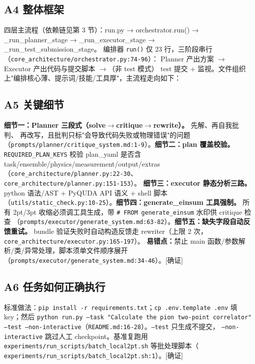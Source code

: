 \documentclass[UTF8]{ctexart}
\begin{document}
\subsection{A4 整体框架}

四层主流程（依赖链见第 3 节）：\textcolor{relation}{run.py → orchestrator.run() →
\_run\_planner\_stage → \_run\_executor\_stage → \_run\_test\_submission\_stage}。
编排器 \texttt{run()} 仅 23 行，三阶段串行（\texttt{\nolinkurl{core_architecture/orchestrator.py:74-96}}）：
Planner 产出方案 $\rightarrow$ Executor 产出代码与提交脚本 $\rightarrow$（非 test 模式）
test 提交 + 监视。文件组织上"编排核心薄、提示词/技能/工具厚"，主流程走向如下：



\subsection{A5 关键细节}

\textbf{细节一：Planner 三段式（solve$\rightarrow$critique$\rightarrow$rewrite）。} 先解、再自我批判、
再改写，且批判只标"会导致代码失败或物理错误"的问题
（\texttt{\nolinkurl{prompts/planner/critique_system.md:1-9}}）。\textbf{细节二：plan 覆盖校验。}
\texttt{REQUIRED\_PLAN\_KEYS} 校验 plan\_yaml 是否含 task/ensemble/physics/measurement/output/extras
（\texttt{\nolinkurl{core_architecture/planner.py:22-30}}、\texttt{\nolinkurl{core_architecture/planner.py:151-153}}）。
\textbf{细节三：executor 静态分析三路。} python 语法/AST + PyQUDA API 语义 + shell 脚本
（\texttt{\nolinkurl{utils/static_check.py:10-25}}）。\textbf{细节四：generate\_einsum 工具强制。}
所有 2pt/3pt 收缩必须调工具生成，带 \texttt{\# FROM generate\_einsum} 水印供 critique 检查
（\texttt{\nolinkurl{prompts/executor/generate_system.md:63-82}}）。\textbf{细节五：缺失字段自动反馈重试。}
bundle 验证失败时自动构造反馈走 rewriter（上限 2 次，\texttt{\nolinkurl{core_architecture/executor.py:165-197}}）。
\textbf{易错点：}禁止 main 函数/参数解析/类/异常处理，脚本须单文件顺序展开
（\texttt{\nolinkurl{prompts/executor/generate_system.md:34-46}}）。[确证]

\subsection{A6 任务如何正确执行}

标准做法：\texttt{pip install -r requirements.txt}；\texttt{cp .env.template .env} 填
key；然后 \texttt{python run.py --task "Calculate the pion two-point correlator" --test
--non-interactive}（\texttt{\nolinkurl{README.md:16-28}}）。\texttt{--test} 只生成不提交，
\texttt{--non-interactive} 跳过人工 checkpoint。基准复跑用
\texttt{experiments/run\_scripts/batch\_local2pt.sh} 等批处理脚本（
\texttt{\nolinkurl{experiments/run_scripts/batch_local2pt.sh:1}}）。[确证]
\end{document}
